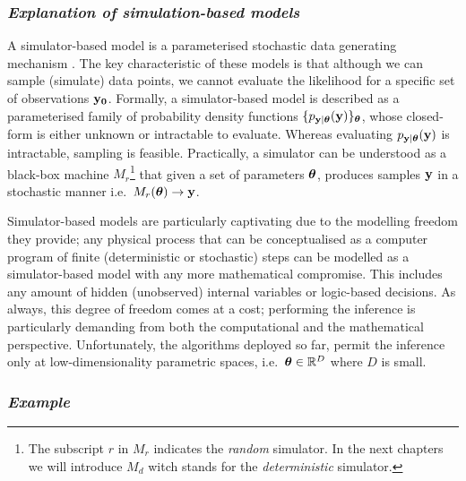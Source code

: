 \subsubsection*{\textit{Explanation of simulation-based models}}

A simulator-based model is a parameterised stochastic data generating
mechanism \autocite{Gutmann2016}. The key characteristic of these models is that although we can sample (simulate) data points, we cannot
evaluate the likelihood for a specific set of observations
$\mathbf{y_0}$. Formally, a simulator-based model is described as a
parameterised family of probability density functions
$\{ p_{\mathbf{y}|\boldsymbol{\theta}}(\mathbf{y}) \}_{\boldsymbol{\theta}}$, whose closed-form is either
unknown or intractable to evaluate. Whereas evaluating
$p_{\mathbf{y}|\boldsymbol{\theta}}(\mathbf{y})$ is intractable, sampling is feasible. Practically, a
simulator can be understood as a black-box machine $M_r$\footnote{The
  subscript $r$ in $M_r$ indicates the \textit{random} simulator. In
  the next chapters we will introduce $M_d$ witch stands for the
  \textit{deterministic} simulator.} that given a set of parameters $\boldsymbol{\theta}$,
produces samples $\mathbf{y}$ in a stochastic manner i.e.\
$M_r(\boldsymbol{\theta}) \rightarrow \mathbf{y}$.

Simulator-based models are particularly captivating due to the
modelling freedom they provide; any physical
process that can be conceptualised as a computer program of finite
(deterministic or stochastic) steps can be modelled as a
simulator-based model with any more mathematical compromise. This includes any amount of hidden (unobserved) internal variables or
logic-based decisions. As always, this degree of freedom comes
at a cost; performing the inference is particularly demanding from both the 
computational and the mathematical perspective. Unfortunately, the
algorithms deployed so far, permit the inference only at
low-dimensionality parametric spaces, i.e.\ $\boldsymbol{\theta} \in \mathbb{R}^D$
where $D$ is small.

\subsubsection*{\textit{Example}}

